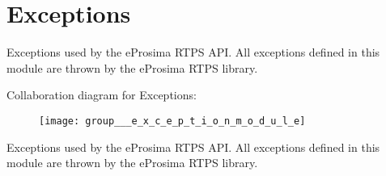 \hypertarget{group___e_x_c_e_p_t_i_o_n_m_o_d_u_l_e}{\section{\-Exceptions}
\label{group___e_x_c_e_p_t_i_o_n_m_o_d_u_l_e}
}


\-Exceptions used by the e\-Prosima \-R\-T\-P\-S \-A\-P\-I. \-All exceptions defined in this module are thrown by the e\-Prosima \-R\-T\-P\-S library.  


\-Collaboration diagram for \-Exceptions\-:\nopagebreak
\begin{figure}[H]
\begin{center}
\leavevmode
\texttt{[image: group\_\_\_e\_x\_c\_e\_p\_t\_i\_o\_n\_m\_o\_d\_u\_l\_e]}
\end{center}
\end{figure}
\-Exceptions used by the e\-Prosima \-R\-T\-P\-S \-A\-P\-I. \-All exceptions defined in this module are thrown by the e\-Prosima \-R\-T\-P\-S library. 